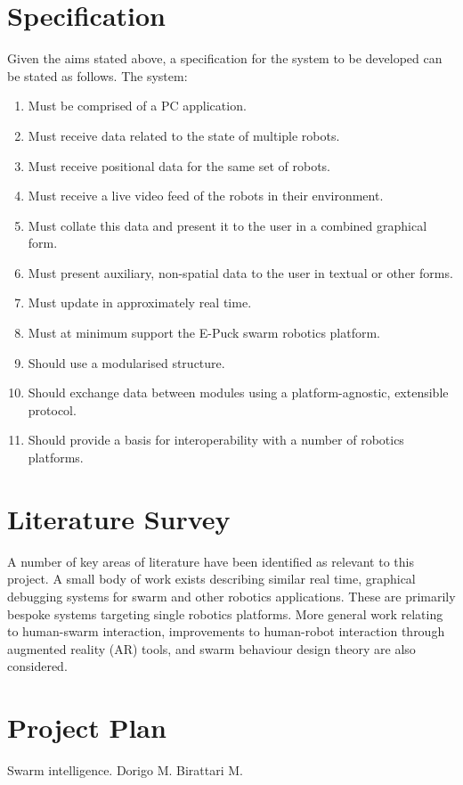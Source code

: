 \documentclass[titlepage,hidelinks,10pt]{article}
\begin{document}
\begin{multicols*}{2}

\section{Specification}
Given the aims stated above, a specification for the system to be developed can be stated as follows. The system:

\begin{enumerate}
	\item Must be comprised of a PC application.
	\item Must receive data related to the state of multiple robots.
	\item Must receive positional data for the same set of robots.
	\item Must receive a live video feed of the robots in their environment.
	\item Must collate this data and present it to the user in a combined graphical form.
	\item Must present auxiliary, non-spatial data to the user in textual or other forms.
	\item Must update in approximately real time.
	\item Must at minimum support the E-Puck swarm robotics platform.
	\item Should use a modularised structure.
	\item Should exchange data between modules using a platform-agnostic, extensible protocol.
	\item Should provide a basis for interoperability with a number of robotics platforms.
\end{enumerate}

\section{Literature Survey}
A number of key areas of literature have been identified as relevant to this project. A small body of work exists describing similar real time, graphical debugging systems for swarm and other robotics applications. These are primarily bespoke systems targeting single robotics platforms. More general work relating to human-swarm interaction, improvements to human-robot interaction through augmented reality (AR) tools, and swarm behaviour design theory are also considered.

\section{Project Plan}
\begin{thebibliography}{1}
 Swarm intelligence. Dorigo M. Birattari M.
\end{thebibliography}

\end{multicols*}
\end{document}
